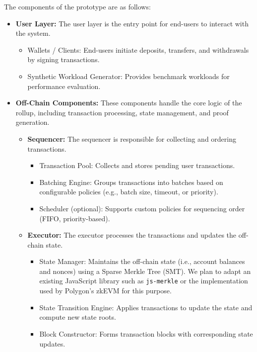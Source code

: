 The components of the prototype are as follows:
\begin{itemize}
    \item \textbf {User Layer:}
    The user layer is the entry point for end-users to interact with the system.
    \begin{itemize}
        \item {Wallets / Clients:} End-users initiate deposits, transfers, and withdrawals by signing transactions.
        \item {Synthetic Workload Generator:} Provides benchmark workloads for performance evaluation.
    \end{itemize}
    
    \item \textbf{Off-Chain Components:}
    These components handle the core logic of the rollup, including transaction processing, state management, and proof generation.
    
    \begin{itemize}
        \item \textbf{Sequencer:}
        The sequencer is responsible for collecting and ordering transactions.
        \begin{itemize}
            \item {Transaction Pool:} Collects and stores pending user transactions.
            \item {Batching Engine:} Groups transactions into batches based on configurable policies (e.g., batch size, timeout, or priority).
            \item {Scheduler (optional):} Supports custom policies for sequencing order (FIFO, priority-based).
        \end{itemize}
        
        \item \textbf{Executor:}
        The executor processes the transactions and updates the off-chain state.
        \begin{itemize}
            \item {State Manager:} Maintains the off-chain state (i.e., account balances and nonces) using a Sparse Merkle Tree (SMT). We plan to adapt an existing JavaScript library such as \texttt{js-merkle} or the implementation used by Polygon's zkEVM for this purpose.
            \item {State Transition Engine:} Applies transactions to update the state and compute new state roots.
            \item {Block Constructor:} Forms transaction blocks with corresponding state updates.
        \end{itemize}
        

\end{itemize}
\end{itemize}
